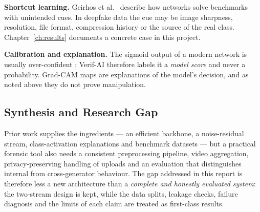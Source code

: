 \textbf{Shortcut learning.} Geirhos et al.\ \citep{geirhos2020shortcut} describe how networks solve benchmarks with unintended cues.
In deepfake data the cue may be image sharpness, resolution, file format, compression history or the source of the real class.
Chapter~\ref{ch:results} documents a concrete case in this project.

\textbf{Calibration and explanation.} The sigmoid output of a modern network is usually over-confident
\citep{guo2017calibration}; Verif-AI therefore labels it a \emph{model score} and never a probability. Grad-CAM maps are explanations of
the model's decision, and as noted above they do not prove manipulation.

\subsection{Synthesis and Research Gap}
Prior work supplies the ingredients --- an efficient backbone, a noise-residual stream, class-activation explanations and benchmark
datasets --- but a practical forensic tool also needs a consistent preprocessing pipeline, video aggregation, privacy-preserving
handling of uploads and an evaluation that distinguishes internal from cross-generator behaviour. The gap addressed in this report is
therefore less a new architecture than a \emph{complete and honestly evaluated system}: the two-stream design is kept, while the data
splits, leakage checks, failure diagnosis and the limits of each claim are treated as first-class results.



